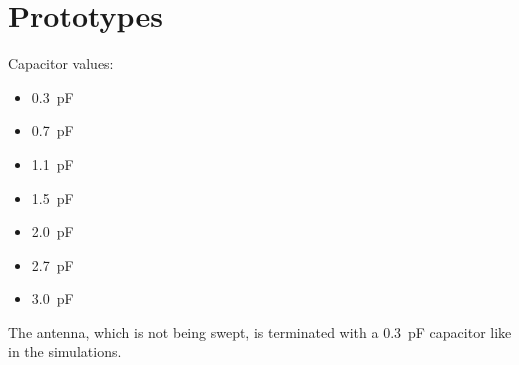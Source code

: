 \chapter{Prototypes}
\label{cha:prototypes}



Capacitor values:
\begin{itemize}
\item \SI{0.3}{pF}
\item \SI{0.7}{pF}
\item \SI{1.1}{pF}
\item \SI{1.5}{pF}
\item \SI{2.0}{pF}
\item \SI{2.7}{pF}
\item \SI{3.0}{pF}
\end{itemize}
The antenna, which is not being swept, is terminated with a \SI{0.3}{pF} capacitor like in the simulations.
